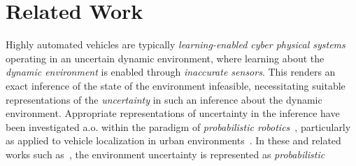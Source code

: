 \section{Related Work}\label{sec:relatedwork}
Highly automated vehicles are typically \emph{learning-enabled cyber physical systems} operating in an uncertain dynamic environment, where learning about the \emph{dynamic environment} is enabled through \emph{inaccurate sensors}. This renders an exact inference of the state of the environment infeasible, necessitating suitable representations of the \emph{uncertainty} in such an inference about the dynamic environment. Appropriate representations of uncertainty in the inference have been investigated a.o. within the paradigm of \emph{probabilistic robotics}~\cite{probrob}, particularly as applied to vehicle localization in urban environments~\cite{Thrun2007,Thrun2009,Thrun2010}. In these and related works such as~\cite{Perrolaz2014,moras2014}, the environment uncertainty is represented as \emph{probabilistic
}

